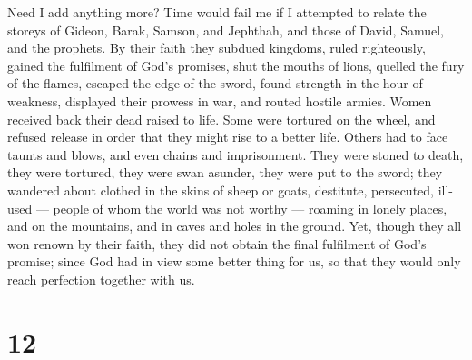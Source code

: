  Need I add anything more? Time would fail me if I
attempted to relate the storeys of Gideon, Barak, Samson, and Jephthah,
and those of David, Samuel, and the prophets.  By their
faith they subdued kingdoms, ruled righteously, gained the fulfilment of
God's promises, shut the mouths of lions,  quelled the fury
of the flames, escaped the edge of the sword, found strength in the hour
of weakness, displayed their prowess in war, and routed hostile armies.
 Women received back their dead raised to life. Some were
tortured on the wheel, and refused release in order that they might rise
to a better life.  Others had to face taunts and blows, and
even chains and imprisonment.  They were stoned to death,
they were tortured, they were swan asunder, they were put to the sword;
they wandered about clothed in the skins of sheep or goats, destitute,
persecuted, ill-used ---  people of whom the world was not
worthy --- roaming in lonely places, and on the mountains, and in caves
and holes in the ground.  Yet, though they all won renown
by their faith, they did not obtain the final fulfilment of God's
promise;  since God had in view some better thing for us,
so that they would only reach perfection together with us.

\hypertarget{section-11}{%
\section{12}\label{section-11}}

